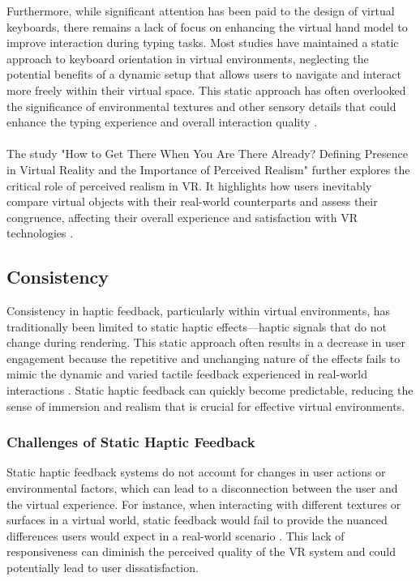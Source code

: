 Furthermore, while significant attention has been paid to the design of virtual keyboards, there remains a lack of focus on enhancing the virtual hand model to improve interaction during typing tasks. Most studies have maintained a static approach to keyboard orientation in virtual environments, neglecting the potential benefits of a dynamic setup that allows users to navigate and interact more freely within their virtual space. This static approach has often overlooked the significance of environmental textures and other sensory details that could enhance the typing experience and overall interaction quality \cite{spence2008multisensory}.\\ \\
The study "How to Get There When You Are There Already? Defining Presence in Virtual Reality and the Importance of Perceived Realism" \cite{presenceVr2021} further explores the critical role of perceived realism in \ac{VR}. It highlights how users inevitably compare virtual objects with their real-world counterparts and assess their congruence, affecting their overall experience and satisfaction with \ac{VR} technologies \cite{milgram1994taxonomy}.
\subsection{Consistency} 
\label{sec: Consistency}

Consistency in haptic feedback, particularly within virtual environments, has traditionally been limited to static haptic effects—haptic signals that do not change during rendering. This static approach often results in a decrease in user engagement because the repetitive and unchanging nature of the effects fails to mimic the dynamic and varied tactile feedback experienced in real-world interactions \cite{hayward2022xr}. Static haptic feedback can quickly become predictable, reducing the sense of immersion and realism that is crucial for effective virtual environments.
\subsubsection{Challenges of Static Haptic Feedback}
Static haptic feedback systems do not account for changes in user actions or environmental factors, which can lead to a disconnection between the user and the virtual experience. For instance, when interacting with different textures or surfaces in a virtual world, static feedback would fail to provide the nuanced differences users would expect in a real-world scenario \cite{mcgill2015dovetail}. This lack of responsiveness can diminish the perceived quality of the \ac{VR} system and could potentially lead to user dissatisfaction.
